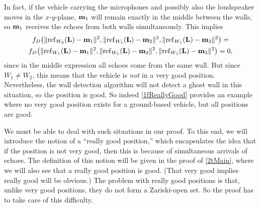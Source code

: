 \documentclass[reqno]{amsart}
\begin{document}
In fact, if the vehicle carrying the microphones and possibly also the
loudspeaker moves in the $x$-$y$-plane, $\mathbf{m}_1$ will
remain exactly in the middle between the walls, so $\mathbf{m}_1$ receives
the echoes from both walls simultaneously. This implies
\begin{multline*}
  f_D\bigl(\lVert\operatorname{ref}_{W_2}(\mathbf{L}) - \mathbf{m}_1\rVert^2,\lVert\operatorname{ref}_{W_1}(\mathbf{L}) - \mathbf{m}_2\rVert^2,\lVert\operatorname{ref}_{W_1}(\mathbf{L}) - \mathbf{m}_3\rVert^2\bigr) = \\
  f_D\bigl(\lVert\operatorname{ref}_{W_1}(\mathbf{L}) - \mathbf{m}_1\rVert^2,\lVert\operatorname{ref}_{W_1}(\mathbf{L}) - \mathbf{m}_2\rVert^2,\lVert\operatorname{ref}_{W_1}(\mathbf{L}) - \mathbf{m}_3\rVert^2\bigr) = 0,
\end{multline*}
since in the middle expression all echoes come from the same wall. But
since $W_1 \ne W_2$, this means that the vehicle is {\em not} in a
very good position. Nevertheless, the wall detection algorithm will
not detect a ghost wall in this situation, so the position is good. So
indeed \cref{1fReallyGood} provides an example where no very good
position exists for a ground-based vehicle, but all positions are
good.

We must be able to deal with such situations in our proof. To this
end, we will introduce the notion of a ``really good position,'' which
encapsulates the idea that if the position is not very good, then this
is because of simultaneous arrivals of echoes. The definition of this
notion will be given in the proof of \cref{2tMain}, where we will
also see that a really good position is good. (That very good implies
really good will be obvious.) The problem with really good positions
is that, unlike very good positions, they do not form a Zariski-open
set. So the proof has to take care of this difficulty.


\end{document}
